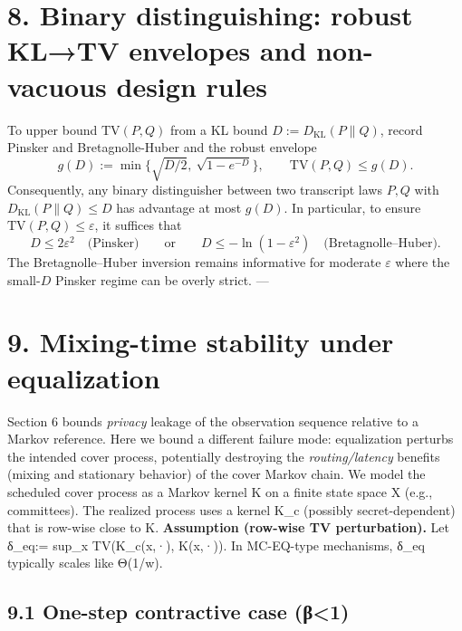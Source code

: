 \documentclass[11pt]{article}
\begin{document}
\hypertarget{binary-distinguishing-robust-kltv-envelopes-and-non-vacuous-design-rules}{%
\section{8. Binary distinguishing: robust KL→TV envelopes and
non-vacuous design
rules}\label{binary-distinguishing-robust-kltv-envelopes-and-non-vacuous-design-rules}}

To upper bound \(\mathrm{TV}(P,Q)\) from a KL bound
\(D:=D_{\mathrm{KL}}(P\|Q)\), record Pinsker and Bretagnolle-Huber and
the robust envelope \[
g(D):= \min\{\sqrt{D/2},\ \sqrt{1-e^{-D}}\},
\qquad \mathrm{TV}(P,Q)\le g(D).
\] Consequently, any binary distinguisher between two transcript laws
\(P,Q\) with \(D_{\mathrm{KL}}(P\|Q)\le D\) has advantage at most
\(g(D)\). In particular, to ensure \(\mathrm{TV}(P,Q)\le \varepsilon\),
it suffices that \[
D \le 2\varepsilon^2 \quad\text{(Pinsker)}\qquad\text{or}\qquad D \le -\ln(1-\varepsilon^2) \quad\text{(Bretagnolle--Huber)}.
\] The Bretagnolle--Huber inversion remains informative for moderate
\(\varepsilon\) where the small-\(D\) Pinsker regime can be overly
strict. ---

\hypertarget{mixing-time-stability-under-equalization}{%
\section{9. Mixing-time stability under
equalization}\label{mixing-time-stability-under-equalization}}

Section 6 bounds \emph{privacy} leakage of the observation sequence
relative to a Markov reference. Here we bound a different failure mode:
equalization perturbs the intended cover process, potentially destroying
the \emph{routing/latency} benefits (mixing and stationary behavior) of
the cover Markov chain. We model the scheduled cover process as a Markov
kernel K on a finite state space X (e.g., committees). The realized
process uses a kernel K\_c (possibly secret-dependent) that is row-wise
close to K. \textbf{Assumption (row-wise TV perturbation).} Let δ\_eq:=
sup\_x TV(K\_c(x,·), K(x,·)). In MC-EQ-type mechanisms, δ\_eq typically
scales like Θ(1/w).

\hypertarget{one-step-contractive-case-ux3b21}{%
\subsection{9.1 One-step contractive case
(β\textless1)}\label{one-step-contractive-case-ux3b21}}
\end{document}
